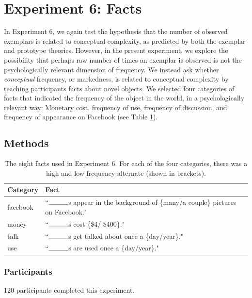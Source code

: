 \section{Experiment 6: Facts}
In Experiment 6, we again test the hypothesis that the number of observed exemplars is related to conceptual complexity, as predicted by both the exemplar and prototype theories. However, in the present experiment, we explore the possibility that perhaps raw number of times an exemplar is observed is not the psychologically relevant dimension of frequency. We instead ask whether {\it conceptual} frequency, or markedness, is related to conceptual complexity by teaching participants facts about novel objects. We selected four categories of facts  that indicated the frequency of the object in the world, in a psychologically relevant way: Monetary cost, frequency of use, frequency of discussion, and frequency of appearance on Facebook (see Table \ref{tab:facts}).

\subsection{Methods}

\begin{table}[t!]
\centering

\begin{tabular}{ll}
\toprule
\textbf{Category} & \textbf{Fact}               \\
\toprule
   facebook & ``$\rule{1cm}{0.15mm}$s appear in the background of \{many/a couple\} pictures on Facebook."\\
   money  &  ``$\rule{1cm}{0.15mm}$s cost \{\$4/ \$400\}."   \\
   talk  & ``$\rule{1cm}{0.15mm}$s get talked about once a \{day/year\}." \\
   use    & ``$\rule{1cm}{0.15mm}$s are used once a \{day/year\}."                             \\

 \bottomrule
\end{tabular}
\caption{The eight facts used in Experiment 6. For each of the four categories, there was a high and low frequency alternate (shown in  brackets).}
\label{tab:facts}
\end{table}

\subsubsection{Participants} 
120 participants completed this experiment. 

